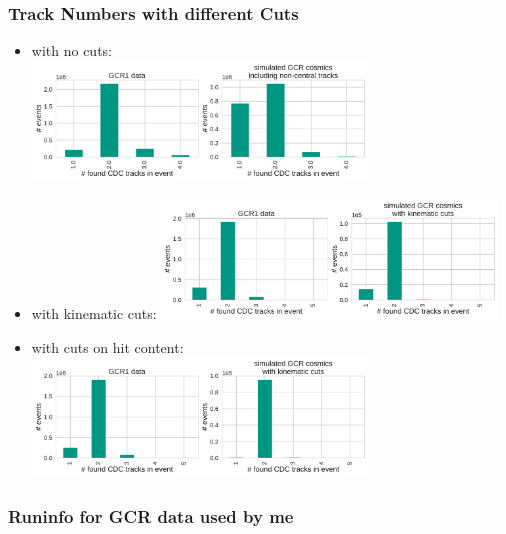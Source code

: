 \documentclass[18pt]{beamer}
\begin{document}
  \begin{frame}[allowframebreaks]
    \frametitle{Track Numbers with different Cuts}
    \begin{itemize}
    \item with no cuts:\\
      \includegraphics[width=0.7\textwidth]{figures/nfound_tracks_nocuts.pdf}
    \item with kinematic cuts:
      \includegraphics[width=0.7\textwidth]{figures/nfound_tracks_kincuts.pdf}\\      
    \item with cuts on hit content:\\
      \includegraphics[width=0.7\textwidth]{figures/nfound_tracks_allcuts.pdf}
    \end{itemize}
  \end{frame}

  \begin{frame}[allowframebreaks]
    \frametitle{Runinfo for GCR data used by me}
    \tiny
    
  \end{frame}
\end{document}
